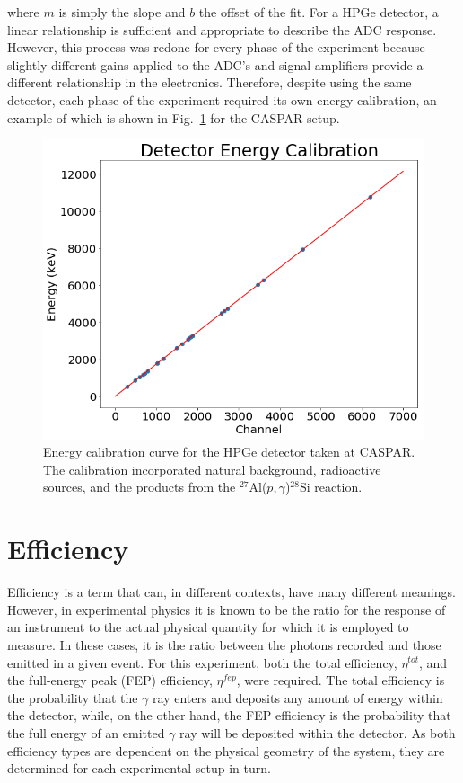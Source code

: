 \noindent where $m$ is simply the slope and $b$ the offset of the fit. For a HPGe detector, a linear relationship is sufficient and appropriate to describe the ADC response. However, this process was redone for every phase of the experiment because slightly different gains applied to the ADC's and signal amplifiers provide a different relationship in the electronics. Therefore, despite using the same detector, each phase of the experiment required its own energy calibration, an example of which is shown in Fig.\ \ref{fig: energyCalibration} for the CASPAR setup.


\begin{figure}
\centering
\includegraphics[width=0.8\linewidth]{figures/detEnergyCalibration.png}
\caption{Energy calibration curve for the HPGe detector taken at CASPAR. The calibration incorporated natural background, radioactive sources, and the products from the $^{27}$Al($p, \gamma$)$^{28}$Si reaction. }
\label{fig: energyCalibration}
\end{figure}




\section{Efficiency}
\label{sec: efficiency}

Efficiency is a term that can, in different contexts, have many different meanings. However, in experimental physics it is known to be the ratio for the response of an instrument to the actual physical quantity for which it is employed to measure. In these cases, it is the ratio between the photons recorded and those emitted in a given event. For this experiment, both the total efficiency, $\eta^{tot}$, and the full-energy peak (FEP) efficiency, $\eta^{fep}$, were required. The total efficiency is the probability that the $\gamma$ ray enters and deposits any amount of energy within the detector, while, on the other hand, the FEP efficiency is the probability that the full energy of an emitted $\gamma$ ray will be deposited within the detector. As both efficiency types are dependent on the physical geometry of the system, they are determined for each experimental setup in turn. 

